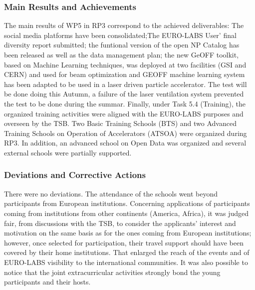 \subsubsection*{Main Results and Achievements}

The main results of WP5 in RP3
correspond to the achieved deliverables: The social media platforms have been consolidated;The EURO-LABS User' final diversity report submitted; the funtional version of the open NP Catalog has been released as well as the data management plan; 
the new GeOFF toolkit, based on Machine Learning techniques, was deployed at two facilities (GSI and CERN) and used for beam optimization and GEOFF machine learning system has been adapted to be used in a laser driven particle accelerator. The test will be done doing this Autumn, a failure of the laser ventilation system prevented the test to be done during the summar. Finally, under Task 5.4 (Training),
the organized training  activities were aligned with the EURO-LABS purposes %
and overseen by the TSB. Two 
Basic Training Schools (BTS) and two Advanced Training Schools on Operation of Accelerators (ATSOA) were organized during RP3. In addition, an advanced school on Open Data was organized and several external schools were partially supported. 


\subsubsection*{Deviations and Corrective Actions}
\label{sec:wp5_deviations}
There were no deviations. The attendance of the schools went  beyond participants from European institutions.
Concerning applications of participants coming from institutions from other continents (America, Africa),
it was judged fair, from discussions with the TSB, to consider the applicants' interest and motivation on the same basis as for the ones coming from European institutions; however, once selected for participation,  their travel support should have been covered by their home institutions. That enlarged the reach of the events and of EURO-LABS visibility  to the international communities. 
It was also possible to notice that the joint extracurricular activities strongly bond the young participants and their hosts.

